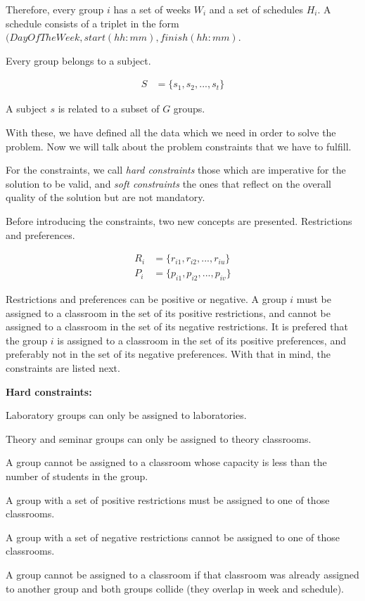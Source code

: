 Therefore, every group $i$ has a set of weeks $W_{i}$ and a set of schedules $H_{i}$. A schedule consists of a triplet in the form $(DayOfTheWeek, start (hh:mm), finish (hh:mm)$.

Every group belongs to a subject.

\begin{align}
    S &= \{ s_{1}, s_{2}, ..., s_{t} \}
\end{align}

A subject $s$ is related to a subset of $G$ groups.

With these, we have defined all the data which we need in order to solve the problem. Now we will talk about the problem constraints that we have to fulfill.

For the constraints, we call \textit{hard constraints} those which are imperative for the solution to be valid, and \textit{soft constraints} the ones that reflect on the overall quality of the solution but are not mandatory.

Before introducing the constraints, two new concepts are presented. Restrictions and preferences.

\begin{align}
    R_{i} &= \{ r_{i1}, r_{i2}, ..., r_{iu} \}\\
    P_{i} &= \{ p_{i1}, p_{i2}, ..., p_{iv} \}
\end{align}

Restrictions and preferences can be positive or negative. A group $i$ must be assigned to a classroom in the set of its positive restrictions, and cannot be assigned to a classroom in the set of its negative restrictions. It is prefered that the group $i$ is assigned to a classroom in the set of its positive preferences, and preferably not in the set of its negative preferences. With that in mind, the constraints are listed next. 

\textbf{Hard constraints:}

\begin{description}
    \item Laboratory groups can only be assigned to laboratories.
    \item Theory and seminar groups can only be assigned to theory classrooms.
    \item A group cannot be assigned to a classroom whose capacity is less than the number of students in the group.
    \item A group with a set of positive restrictions must be assigned to one of those classrooms.
    \item A group with a set of negative restrictions cannot be assigned to one of those classrooms.
    \item A group cannot be assigned to a classroom if that classroom was already assigned to another group and both groups collide (they overlap in week and schedule).
\end{description}

